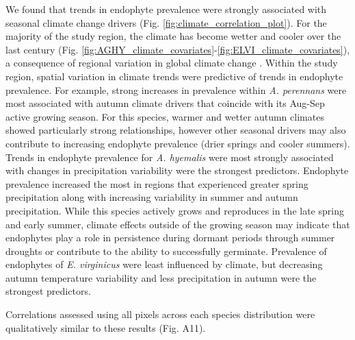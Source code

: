 \documentclass[11pt]{article}
\let\cite\citep
\newcommand{\tom}[2]{{\color{red}{#1}}\footnote{\textit{\color{red}{#2}}}}
\begin{document}
We found that trends in endophyte prevalence were strongly associated with seasonal climate change drivers (Fig. \ref{fig:climate_correlation_plot}).
For the majority of the study region, the climate has become wetter and cooler over the last century (Fig. \ref{fig:AGHY_climate_covariates}-\ref{fig:ELVI_climate_covariates}), a consequence of regional variation in global climate change \cite{ipcc_2021}. 
Within the study region, spatial variation in climate trends were predictive of trends in endophyte prevalence.
For example, strong increases in prevalence within \emph{A. perennans} were most associated with autumn climate drivers that coincide with its Aug-Sep active growing season. 
For this species, warmer and wetter autumn climates showed particularly strong relationships, however other seasonal drivers may also contribute to increasing endophyte prevalence (drier springs and cooler summers).
Trends in endophyte prevalence for \emph{A. hyemalis} were most strongly associated with changes in precipitation variability were the strongest predictors.
Endophyte prevalence increased the most in regions that experienced greater spring precipitation along with increasing variability in summer and autumn precipitation. 
While this species actively grows and reproduces in the late spring and early summer, climate effects outside of the growing season may indicate that endophytes play a role in persistence during dormant periods through summer droughts or contribute to the ability to successfully germinate.
Prevalence of endophytes of \emph{E. virginicus} were least influenced by climate, but decreasing autumn temperature variability and less precipitation in autumn were the strongest predictors.


Correlations assessed using all pixels across each species distribution were qualitatively similar to these results (Fig. A11).
\end{document}
